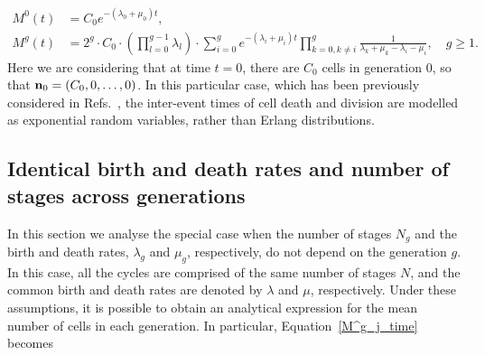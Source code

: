 \documentclass[10pt]{article}
\numberwithin{equation}{section}
\begin{document}
\begin{equation}
\begin{split}
    \label{sol_exp}
    M^0(t) & = C_0 e^{-(\lambda_0 + \mu_0)t}, \\
    M^g(t) & = 2^g\cdot C_0\cdot \left(\prod_{l=0}^{g-1} \lambda_l\right)\cdot \sum_{i=0}^g e^{-(\lambda_i + \mu_i)t} \prod_{k=0, k \neq i}^g \frac{1}{\lambda_k+\mu_k-\lambda_i-\mu_i}, \quad g\geq1.
\end{split}
\end{equation}
 Here we are considering that at time $t=0$, there are $C_0$ cells in generation $0$, so that ${\bf n}_0=(C_0,0,\ldots,0)$. In this particular case, which has been previously considered in Refs.~\cite{deboer-perelson,luzyanina2007computational,luzyanina2018,revy}, the inter-event times of cell death and division are modelled as exponential random variables, rather than Erlang distributions.

\subsection{Identical birth and death rates and number of stages across generations} 
\label{new_gen_def}

In this section we analyse the special case when the number of stages $N_g$ and the birth and death rates, $\lambda_g$ and $\mu_g$, respectively, do not depend on the generation $g$. In this case, all the cycles are comprised of the same number of stages $N$, and the common birth and death rates are denoted by $\lambda$ and $\mu$, respectively. Under these assumptions, it is possible to obtain an analytical expression for the mean number of cells in each generation. In particular, Equation~\eqref{M^g_j_time} becomes
\end{document}
